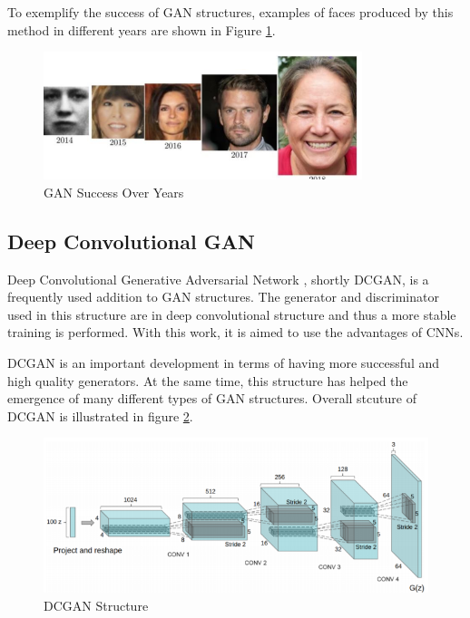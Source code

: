 To exemplify the success of GAN structures, examples of faces produced by this method in different years are shown in Figure \ref{fig:gan-success}.

\begin{figure}[h]
    \centering
    \includegraphics{figures/chapter3/gan-success-over-years.png}
    \vspace*{3mm}
    \caption{GAN Success Over Years \cite{ganoverview}}
    \label{fig:gan-success}
\end{figure}

\subsection{Deep Convolutional GAN}

Deep Convolutional Generative Adversarial Network \cite{dcgan}, shortly DCGAN, is a frequently used addition to GAN structures. The generator and discriminator used in this structure are in deep convolutional structure and thus a more stable training is performed. With this work, it is aimed to use the advantages of CNNs.

DCGAN is an important development in terms of having more successful and high quality generators. At the same time, this structure has helped the emergence of many different types of GAN structures. Overall stcuture of DCGAN is illustrated in figure \ref{fig:dcgan}.

\begin{figure}[h]
    \centering
    \includegraphics[scale=0.8]{figures/chapter3/dc-gan-structure.png}
    \caption{DCGAN Structure \cite{dcgan}}
    \label{fig:dcgan}
\end{figure}

